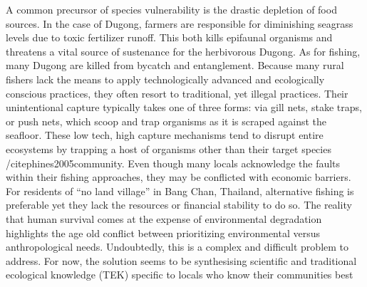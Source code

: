 A common precursor of species vulnerability is the drastic depletion of food sources. In the case of Dugong, farmers are responsible for diminishing seagrass levels due to toxic fertilizer runoff.  This both kills epifaunal organisms and threatens a vital source of sustenance for the herbivorous Dugong. As for fishing, many Dugong are killed from bycatch and entanglement. Because many rural fishers lack the means to apply technologically advanced and ecologically conscious practices, they often resort to traditional, yet illegal practices. Their unintentional capture typically takes one of three forms: via gill nets, stake traps, or push nets, which scoop and trap organisms as it is scraped against the seafloor. These low tech, high capture mechanisms tend to disrupt entire ecosystems by trapping a host of organisms other than their target species /citep{hines2005community}. Even though many locals acknowledge the faults within their fishing approaches, they may be conflicted with economic barriers. For residents of ``no land village'' in Bang Chan, Thailand, alternative fishing is preferable yet they lack the resources or financial stability to do so.  The reality that human survival comes at the expense of environmental degradation highlights the age old conflict between prioritizing environmental versus anthropological  needs. Undoubtedly, this is a complex and difficult problem to address. For now, the solution seems to be synthesising scientific and traditional ecological knowledge (TEK) specific to locals who know their communities best %




  
